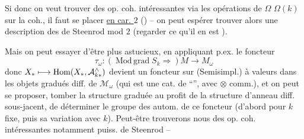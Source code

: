 Si donc on veut trouver des op. coh. intéressantes via les opérations de $\Omega$
 $\Omega(k)$ sur la coh., il faut 
se placer \uline{en car. $2$} ()
-- on peut espérer trouver alors une
description des 
de Steenrod mod $2$ (regarder ce qu'il en est ).

Mais on peut essayer d'être plus astucieux, en appliquant p.ex. le foncteur
\[
 \tau_\omega:(\operatorname{Mod\,grad}S_k\Rightarrow)M\longrightarrow M_\omega
\]
donc $X_*\longmapsto\operatorname{Hom}(X_*,\mathcal A_{k*}^{{\wedge}})$ devient un
foncteur sur (Semisimpl.) à valeurs
dans les objets  gradués diff. de $\mathcal M_\omega$
(qui est une cat. de  ``'',
avec $\otimes$ comm.), et on peut se
proposer,  tomber la structure
graduée au profit de la structure
d'anneau diff. sous-jacent, de
déterminer le groupe des autom.
de ce foncteur (d'abord pour $k$ fixe,
puis sa variation avec $k$). Peut-être
trouverons nous des op. coh. intéressantes
notamment puiss. de Steenrod --
